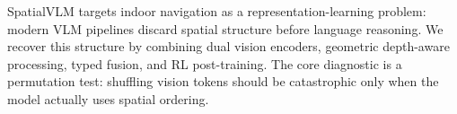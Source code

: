 SpatialVLM targets indoor navigation as a representation-learning problem: modern VLM pipelines
discard spatial structure before language reasoning. We recover this structure by combining dual
vision encoders, geometric depth-aware processing, typed fusion, and RL post-training. The core
diagnostic is a permutation test: shuffling vision tokens should be catastrophic only when the
model actually uses spatial ordering.
